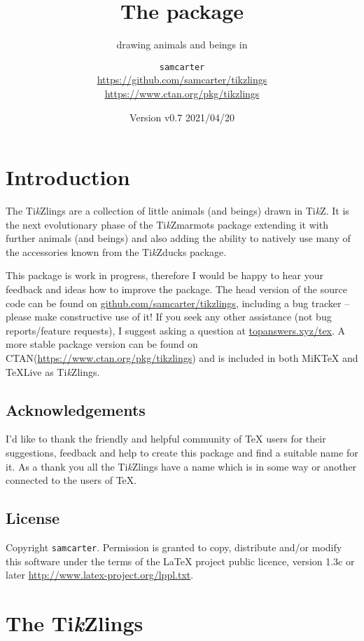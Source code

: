 \documentclass[parskip=half]{scrartcl}
\title{The \texorpdfstring{\tikzlings}{tikzlings} package}
\subtitle{drawing animals and beings in \TikZ}
\author{%
  \texorpdfstring{\texttt{samcarter}\\[0.8em]
    \url{https://github.com/samcarter/tikzlings}\\
    \url{https://www.ctan.org/pkg/tikzlings}
  }{samcarter}}
\date{Version v0.7 \textendash{} 2021/04/20}
\newcommand{\CTAN}{\textsc{CTAN}\xspace}
\newcommand{\TikZ}{Ti\emph{k}Z\xspace}
\newcommand{\tikzducks}{Ti\emph{k}Zducks\xspace}
\newcommand{\tikzmarmots}{Ti\emph{k}Zmarmots\xspace}
\newcommand{\tikzlings}{Ti\emph{k}Zlings\xspace}
\newcommand{\miktex}{MiK\TeX\xspace}
\newcommand{\texlive}{\TeX{}Live\xspace}
\begin{document}
\maketitle
\thispagestyle{scrheadings}

\section*{Introduction}
\label{intro}

The \tikzlings are a collection of little animals (and beings) drawn in \TikZ. It is the next evolutionary phase of the \tikzmarmots package extending it with further animals (and beings) and also adding the ability to natively use many of the accessories known from the \tikzducks package. 

This package is work in progress, therefore I would be happy to hear your feedback and ideas how to improve the package. 
The head version of the source code can be found on \url{github.com/samcarter/tikzlings}, including a bug tracker -- please make constructive use of it! 
If you seek any other assistance (not bug reports/feature requests), I suggest asking a question at \url{topanswers.xyz/tex}.
A more stable package version can be found on \CTAN (\url{https://www.ctan.org/pkg/tikzlings}) and is included in both \miktex and \texlive as \tikzlings. 

\subsection*{Acknowledgements}

I'd like to thank the friendly and helpful community of \TeX{} users for their suggestions, feedback and help to create this package and find a suitable name for it. As a thank you all the \tikzlings have a name which is in some way or another connected to the users of \TeX{}.

\subsection*{License}

Copyright 
\texttt{samcarter}. Permission is granted to copy, distribute and\slash or modify this software under the terms of the LaTeX project public licence, version 1.3c or later \url{http://www.latex-project.org/lppl.txt}.

\clearpage
\section*{The \tikzlings}
\end{document}
